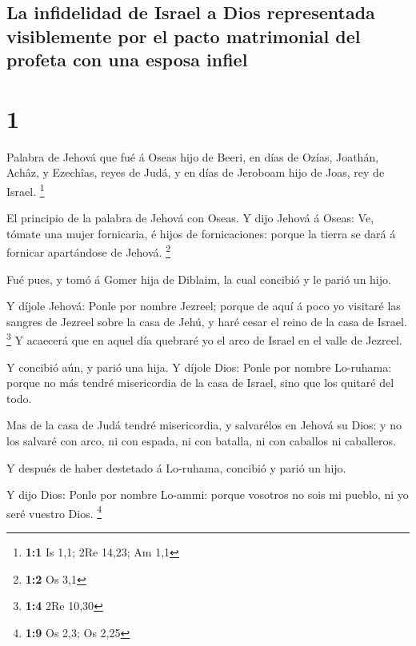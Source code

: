 \hypertarget{la-infidelidad-de-israel-a-dios-representada-visiblemente-por-el-pacto-matrimonial-del-profeta-con-una-esposa-infiel}{%
\subsection{La infidelidad de Israel a Dios representada visiblemente
por el pacto matrimonial del profeta con una esposa
infiel}\label{la-infidelidad-de-israel-a-dios-representada-visiblemente-por-el-pacto-matrimonial-del-profeta-con-una-esposa-infiel}}

\hypertarget{section}{%
\section{1}\label{section}}

 Palabra de Jehová que fué á Oseas hijo de Beeri, en días de
Ozías, Joathán, Achâz, y Ezechîas, reyes de Judá, y en días de Jeroboam
hijo de Joas, rey de Israel. \footnote{\textbf{1:1} Is 1,1; 2Re 14,23;
  Am 1,1}

 El principio de la palabra de Jehová con Oseas. Y dijo
Jehová á Oseas: Ve, tómate una mujer fornicaria, é hijos de
fornicaciones: porque la tierra se dará á fornicar apartándose de
Jehová. \footnote{\textbf{1:2} Os 3,1}

 Fué pues, y tomó á Gomer hija de Diblaim, la cual concibió
y le parió un hijo.

 Y díjole Jehová: Ponle por nombre Jezreel; porque de aquí á
poco yo visitaré las sangres de Jezreel sobre la casa de Jehú, y haré
cesar el reino de la casa de Israel. \footnote{\textbf{1:4} 2Re 10,30}
 Y acaecerá que en aquel día quebraré yo el arco de Israel
en el valle de Jezreel.

 Y concibió aún, y parió una hija. Y díjole Dios: Ponle por
nombre Lo-ruhama: porque no más tendré misericordia de la casa de
Israel, sino que los quitaré del todo.

 Mas de la casa de Judá tendré misericordia, y salvarélos en
Jehová su Dios: y no los salvaré con arco, ni con espada, ni con
batalla, ni con caballos ni caballeros.

 Y después de haber destetado á Lo-ruhama, concibió y parió
un hijo.

 Y dijo Dios: Ponle por nombre Lo-ammi: porque vosotros no
sois mi pueblo, ni yo seré vuestro Dios. \footnote{\textbf{1:9} Os 2,3;
  Os 2,25}


